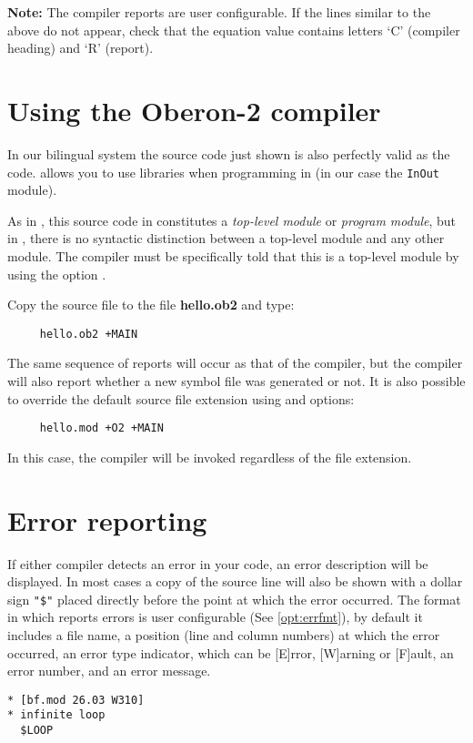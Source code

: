 {\bf Note:} The \XDS{} compiler reports are user configurable.
If the lines similar to the above do not appear, check that the 
equation value contains letters `C' (compiler heading) and `R' (report).

\section{Using the Oberon-2 compiler}

In our bilingual system the \mt{} source code just shown is also
perfectly valid as the \ot{} code. \xds{} allows you to
use \mt{} libraries when programming in \ot{} (in our case the
{\tt InOut} module).

As in \mt{}, this source code in \ot{} constitutes
a {\em top-level module} or {\em program module},
but in \ot{}, there is no syntactic distinction between
a top-level module and any other module.
The \ot{} compiler must be specifically told that this is
a top-level module by using the option .

Copy the source file to the file {\bf hello.ob2} and type:

\verb'    '\XC{}\verb' hello.ob2 +MAIN'

The same sequence of reports will occur as that of the \mt{} compiler,
but the \ot{} compiler will also report whether a new symbol
file was generated or not.
It is also possible to override the default source file extension using
 and  options:

\verb'    '\XC{}\verb' hello.mod +O2 +MAIN'

In this case, the \ot{} compiler will be invoked regardless
of the file extension.

\section{Error reporting}

If either compiler detects an error in your code, an error description
will be displayed. In most cases a copy of the source line will also be
shown with a dollar sign \verb|"$"| placed directly before the point at
which the error occurred. The format in which \xds{} reports errors is
user configurable (See \ref{opt:errfmt}), by default it includes a
file name, a position (line and column numbers) at which the error occurred,
an error type indicator, which can be [E]rror, [W]arning or [F]ault,
an error number, and an error message.

\Example
{\samepage
\begin{verbatim}
* [bf.mod 26.03 W310]
* infinite loop
  $LOOP
\end{verbatim}
} %
\pagebreak[1]

